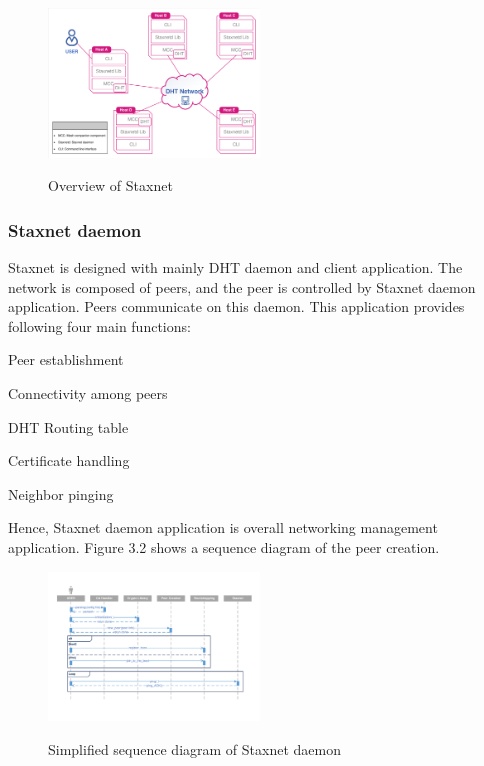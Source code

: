 \begin{figure}[!ht]
	\centering
	\includegraphics[width=0.5\textwidth]{images/fig_3_1.pdf}\\
	\caption{Overview of Staxnet}
	\label{fig:Staxnet}
\end{figure}

\subsubsection{Staxnet daemon}

Staxnet is designed with mainly DHT daemon and client application. The network is composed of peers, and the peer is controlled by Staxnet daemon application. Peers communicate on this daemon. This application provides following four main functions:

\begin{description}
	\item Peer establishment
	\item Connectivity among peers
	\item DHT Routing table
	\item Certificate handling
	\item Neighbor pinging
\end{description}

Hence, Staxnet daemon application is overall networking management application. Figure 3.2 shows a sequence diagram of the peer creation. 

\begin{figure}[!ht]
	\centering
	\includegraphics[width=0.5\textwidth]{images/seq3_2.pdf}\\
	\caption{Simplified sequence diagram of Staxnet daemon}
	\label{fig:Staxnet daemon}
\end{figure}

